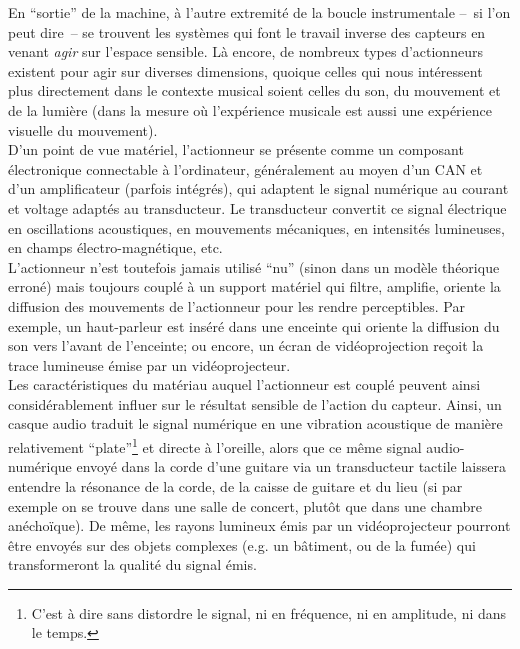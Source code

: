 \noindent En ``sortie'' de la machine, à l'autre extremité de la boucle instrumentale --~si l'on peut dire~-- se trouvent les systèmes qui font le travail inverse des capteurs en venant \textit{agir} sur l'espace sensible. Là encore, de nombreux types d'actionneurs existent pour agir sur diverses dimensions, quoique celles qui nous intéressent plus directement dans le contexte musical soient celles du son, du mouvement et de la lumière (dans la mesure où l'expérience musicale est aussi une expérience visuelle du mouvement).\\
\indent D'un point de vue matériel, l'actionneur se présente comme un composant électronique connectable à l'ordinateur, généralement au moyen d'un \gls{CAN} et d'un amplificateur (parfois intégrés), qui adaptent le signal numérique au courant et voltage adaptés au transducteur. Le transducteur convertit ce signal électrique en oscillations acoustiques, en mouvements mécaniques, en intensités lumineuses, en champs électro-magnétique, etc.\\
\indent L'actionneur n'est toutefois jamais utilisé ``nu'' (sinon dans un modèle théorique erroné) mais toujours couplé à un support matériel qui filtre, amplifie, oriente la diffusion des mouvements de l'actionneur pour les rendre perceptibles. Par exemple, un haut-parleur est inséré dans une enceinte qui oriente la diffusion du son vers l'avant de l'enceinte; ou encore, un écran de vidéoprojection reçoit la trace lumineuse émise par un vidéoprojecteur.\\
\indent Les caractéristiques du matériau auquel l'actionneur est couplé peuvent ainsi considérablement influer sur le résultat sensible de l'action du capteur. Ainsi, un casque audio traduit le signal numérique en une vibration acoustique de manière relativement ``plate''\footnote{C'est à dire sans distordre le signal, ni en fréquence, ni en amplitude, ni dans le temps.} et directe à l'oreille, alors que ce même signal audio-numérique envoyé dans la corde d'une guitare via un transducteur tactile laissera entendre la résonance de la corde, de la caisse de guitare et du lieu (si par exemple on se trouve dans une salle de concert, plutôt que dans une chambre anéchoïque). De même, les rayons lumineux émis par un vidéoprojecteur pourront être envoyés sur des objets complexes (e.g. un bâtiment, ou de la fumée) qui transformeront la qualité du signal émis.\\
